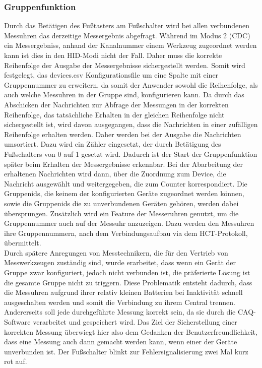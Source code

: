 \subsubsection{Gruppenfunktion}
\label{Gruppenfunktion}
Durch das Betätigen des Fußtasters am Fußschalter wird bei allen verbundenen Messuhren das derzeitige Messergebnis abgefragt. Während im Modus 2 (\ac{CDC}) ein Messergebniss, anhand der Kanalnummer einem Werkzeug zugeordnet werden kann ist dies in den \ac{HID}-Modi nicht der Fall. Daher muss die korrekte Reihenfolge der Ausgabe der Messergebnisse sichergestellt werden. Somit wird festgelegt, das devices.csv Konfigurationsfile um eine Spalte mit einer Gruppennummer zu erweitern, da somit der Anwender sowohl die Reihenfolge, als auch welche Messuhren in der Gruppe sind, konfigurieren kann. Da durch das Abschicken der Nachrichten zur Abfrage der Messungen in der korrekten Reihenfolge, das tatsächliche Erhalten in der gleichen Reihenfolge nicht sichergestellt ist, wird davon ausgegangen, dass die Nachrichten in einer zufälligen Reihenfolge erhalten werden. Daher werden bei der Ausgabe die Nachrichten umsortiert. Dazu wird ein Zähler eingesetzt, der durch Betätigung des Fußschalters von 0 auf 1 gesetzt wird. Dadurch ist der Start der Gruppenfunktion später beim Erhalten der Messergebnisse erkennbar. Bei der Abarbeitung der erhaltenen Nachrichten wird dann, über die Zuordnung zum Device, die Nachricht ausgewählt und weitergegeben, die zum Counter korrespondiert. Die Gruppenids, die keinem der konfigurierten Geräte zugeordnet werden können, sowie die Gruppenids die zu unverbundenen Geräten gehören, werden dabei übersprungen. Zusätzlich wird ein Feature der Messeruhren genutzt, um die Gruppennummer auch auf der Messuhr anzuzeigen. Dazu werden den Messuhren ihre Gruppennummern, nach dem Verbindungsaufbau via dem \ac{HCT}-Protokoll, übermittelt.\\
Durch spätere Anregungen von Messtechnikern, die für den Vertrieb von Messwerkzeugen zuständig sind, wurde erarbeitet, dass wenn ein Gerät der Gruppe zwar konfiguriert, jedoch nicht verbunden ist, die präferierte Lösung ist die gesamte Gruppe nicht zu triggern. Diese Problematik entsteht dadurch, dass die Messuhren aufgrund ihrer relativ kleinen Batterien bei Inaktivität schnell ausgeschalten werden und somit die Verbindung zu ihrem Central trennen. Andererseits soll jede durchgeführte Messung korrekt sein, da sie durch die \ac{CAQ}-Software verarbeitet und gespeichert wird. Das Ziel der Sicherstellung einer korrekten Messung überwiegt hier also dem Gedanken der Benutzerfreundlichkeit, dass eine Messung auch dann gemacht werden kann, wenn einer der Geräte unverbunden ist. Der Fußschalter blinkt zur Fehlersignalisierung zwei Mal kurz rot auf.\\

